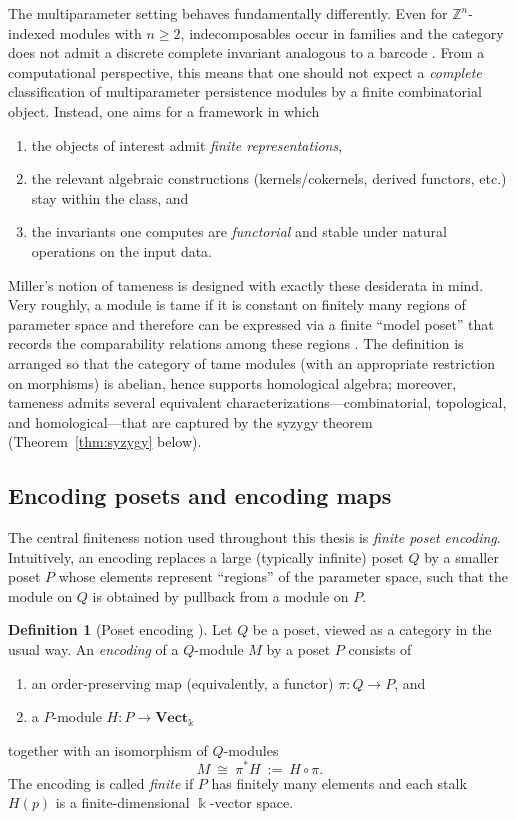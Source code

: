 \documentclass{article}
\newcommand{\kk}{\Bbbk}
\newcommand{\<}{\langle}
\renewcommand{\>}{\rangle}
\newcommand{\bbb}[1]{\ensuremath{\mathbb{#1}}}
\theoremstyle{definition}
\newtheorem{defn}[theorem]{Definition}
\theoremstyle{remark}
\begin{document}
	The multiparameter setting behaves fundamentally differently.  Even for
	$\bbb{Z}^n$-indexed modules with $n\ge 2$, indecomposables occur in families and the
	category does not admit a discrete complete invariant analogous to a barcode \cite{CZ09}.
	From a computational perspective, this means that one should not expect a \emph{complete}
	classification of multiparameter persistence modules by a finite combinatorial object.
	Instead, one aims for a framework in which
	\begin{enumerate}[label=(\roman*)]
		\item the objects of interest admit \emph{finite representations},
		\item the relevant algebraic constructions (kernels/cokernels, derived functors, etc.)
		stay within the class, and
		\item the invariants one computes are \emph{functorial} and stable under natural
		operations on the input data.
	\end{enumerate}
	
	Miller's notion of tameness is designed with exactly these desiderata in mind.
	Very roughly, a module is tame if it is constant on finitely many regions of parameter
	space and therefore can be expressed via a finite ``model poset'' that records the
	comparability relations among these regions \cite{Mil20}.
	The definition is arranged so that the category of tame modules (with an appropriate
	restriction on morphisms) is abelian, hence supports homological algebra; moreover,
	tameness admits several equivalent characterizations---combinatorial, topological, and
	homological---that are captured by the syzygy theorem (Theorem~\ref{thm:syzygy} below).
	
	\subsection{Encoding posets and encoding maps}
	\label{subsec:encoding-posets}
	
	The central finiteness notion used throughout this thesis is \emph{finite poset encoding}.
	Intuitively, an encoding replaces a large (typically infinite) poset $Q$ by a smaller
	poset $P$ whose elements represent ``regions'' of the parameter space, such that the
	module on $Q$ is obtained by pullback from a module on $P$.
	
	\begin{defn}[Poset encoding {\cite[Def.~4.1]{Mil20}}]
		\label{def:poset-encoding}
		Let $Q$ be a poset, viewed as a category in the usual way.
		An \emph{encoding} of a $Q$-module $M$ by a poset $P$ consists of
		\begin{enumerate}[label=(\roman*)]
			\item an order-preserving map (equivalently, a functor) $\pi \colon Q \to P$, and
			\item a $P$-module $H \colon P \to \mathbf{Vect}_{\kk}$
		\end{enumerate}
		together with an isomorphism of $Q$-modules
		\[
		M \ \cong \ \pi^*H \ := \ H\circ \pi .
		\]
		The encoding is called \emph{finite} if $P$ has finitely many elements and each stalk
		$H(p)$ is a finite-dimensional $\kk$-vector space.
	\end{defn}
	
\end{document}
